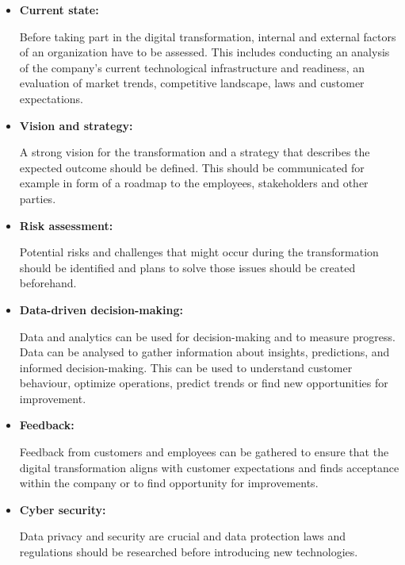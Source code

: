 \documentclass[a4]{scrartcl}
\begin{document}
\begin{itemize}
	
	
\item \textbf{Current state:}

Before taking part in the digital transformation, internal and external factors of an organization have to be assessed. This includes conducting an analysis of the company's current technological infrastructure and readiness, an evaluation of market trends, competitive landscape, laws and customer expectations. \cite{air, tips2}



\item \textbf{Vision and strategy:} 

A strong vision for the transformation and a strategy that describes the expected outcome should be defined. This should be communicated for example in form of a roadmap to the employees, stakeholders and other parties.~\cite{tips2, digitalmatrix, leadingdigital}




\item \textbf{Risk assessment:} 

Potential risks and challenges that might occur during the transformation should be identified and plans to solve those issues should be created beforehand. \cite{tips2, tips1}

	
\item \textbf{Data-driven decision-making:} 

Data and analytics can be used for decision-making and to measure progress. Data can be analysed to gather information about insights, predictions, and informed decision-making. This can be used to understand customer behaviour, optimize operations, predict trends or find new opportunities for improvement.~\cite{DDDM, masterthesis}


\item \textbf{Feedback:} 

Feedback from customers and employees can be gathered to ensure that the digital transformation aligns with customer expectations and finds acceptance within the company or to find opportunity for improvements. \cite{tips2}
	
	
\item \textbf{Cyber security:} 

Data privacy and security are crucial and data protection laws and regulations should be researched before introducing new technologies.~\cite{digitalmatrix, wiwi}

	


\end{itemize}
\end{document}
